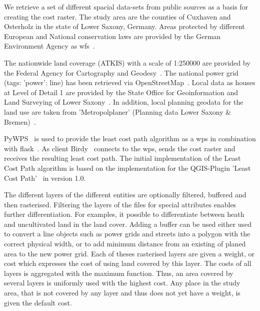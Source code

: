 
We retrieve a set of different spacial data-sets from  public sources as a basis for creating the cost raster.
The study area are the counties of Cuxhaven and Osterholz in the state of Lower Saxony, Germany.
Areas protected by different European and National conservation laws are provided by the German Environment Agency
as \acrfull{wfs}~\cite{noauthor_schutzgebiete_2015}.

The nationwide land coverage (ATKIS) with a scale of 1:250000 are provided by the Federal Agency for Cartography
and Geodesy~\cite{noauthor_digitales_2021}.
The national power grid (tags: 'power': line) has been retrieved via OpenStreetMap~\cite{boeing_osmnx_2017}.
Local data as houses at Level of Detail 1 are provided by the State Office for Geoinformation and Land Surveying of
Lower Saxony~\cite{noauthor_opengeodatani_2022}.
In addition, local planning geodata for the land use are taken
from 'Metropolplaner' (Planning data Lower Saxony \& Bremen)~\cite{noauthor_metropolplaner_2022}.

PyWPS~\cite{noauthor_welcome_2016} is used to provide the least cost path algorithm as a \acrfull{wps} in combination with flask~\cite{noauthor_flask_nodate}.
As client Birdy~\cite{noauthor_birdy_nodate} connects to the \acrshort{wps}, sends the cost raster and receives the resulting least cost path.
The initial implementation of the Least Cost Path algorithm is based on the implementation for the QGIS-Plugin
'Least Cost Path'~\cite{noauthor_leastcostpathdijkstra_algorithmpy_2022} in version 1.0.


The different layers of the different entities are optionally filtered, buffered and then rasterised.
Filtering the layers of the files for special attributes enables further differentiation.
For examples, it possible to differentiate between heath and uncultivated land in the land cover.
Adding a buffer can be used either used to convert a line objects such as power grids and streets into a polygon with the
correct physical width, or to add minimum distance from an existing of planed area to the new power grid.
Each of theses rasterised layers are given a weight, or cost which expresses the cost of using land covered by this layer.
The costs of all layers is aggregated with the maximum function.
Thus, an area covered by several layers is uniformly used with the highest cost.
Any place in the study area, that is not covered by any layer and thus does not yet have a weight, is given the default cost.

